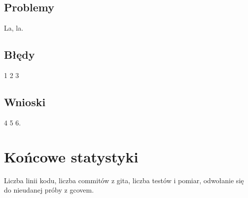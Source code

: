 \documentclass{article}
\begin{document}
	\subsection{Problemy}
	La, la.
	\subsection{Błędy}
	1 2 3
	\subsection{Wnioski}
 	4 5 6.
 	
 	\section{Końcowe statystyki}
 	Liczba linii kodu, liczba commitów z gita, liczba testów i pomiar, odwołanie się do nieudanej próby z gcovem.
 	
 
  
\end{document}
